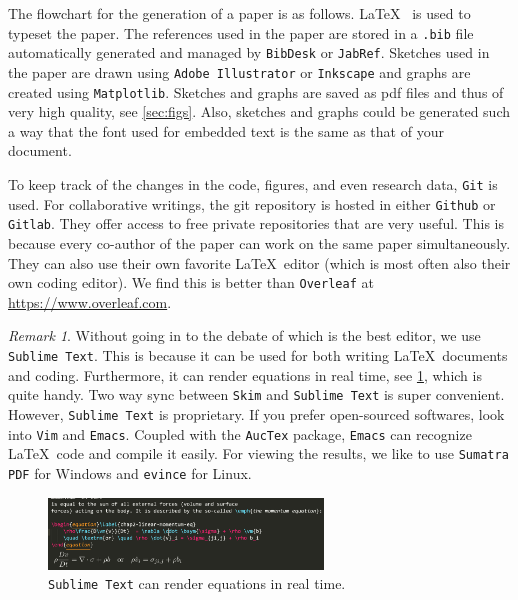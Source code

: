 \documentclass[authoryear,3p,times,preprint,review,fleqn]{elsarticle}
\numberwithin{equation}{section}
\theoremstyle{remark}
\newtheorem{rmk}{Remark}
\begin{document}
The flowchart for the generation of a paper is as follows. \LaTeX~ is used to typeset the paper. The references used in the paper are stored in a \texttt{.bib} file automatically generated and managed by \texttt{BibDesk} or \texttt{JabRef}. Sketches used in the paper are drawn using \texttt{Adobe Illustrator} or \texttt{Inkscape} and graphs are created using \texttt{Matplotlib}. Sketches and graphs are saved as pdf files and thus of very high quality, see \cref{sec:figs}. Also, sketches and graphs could be generated such a way that the font used for embedded text is the same as that of your document.

To keep track of the changes in the code, figures, and even research data, \texttt{Git} is used. For collaborative writings, the git repository is hosted in either \texttt{Github} or \texttt{Gitlab}. They offer access to free private repositories that are very useful. This is because every co-author of the paper can work on the same paper simultaneously. They can also use their own favorite \LaTeX\ editor (which is most often also their own coding editor). We find this is better than \texttt{Overleaf} at \url{https://www.overleaf.com}.




\begin{rmk}
Without going in to the debate of which is the best editor, we use \texttt{Sublime Text}. This is
because it can be used for both writing \LaTeX\ documents and coding. Furthermore, it can render equations in real time, see  \cref{fig:sublime-text}, which is quite handy. Two way sync between \texttt{Skim} and \texttt{Sublime Text} is super convenient. However, \texttt{Sublime Text} is proprietary. If you prefer open-sourced softwares, look into \texttt{Vim} and \texttt{Emacs}. Coupled with the \texttt{AucTex} package, \texttt{Emacs} can recognize \LaTeX\ code and compile it easily. For viewing the results, we like to use \texttt{Sumatra PDF} for Windows and \texttt{evince} for Linux.

\begin{figure}[h!]
  \centering 
   \includegraphics[width=0.65\textwidth]{sublime-text}
   \caption{\texttt{Sublime Text} can render equations in real time.}
\label{fig:sublime-text}
\end{figure}
\end{rmk}
\end{document}

